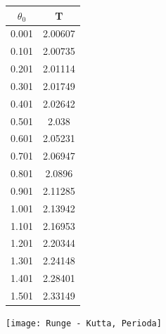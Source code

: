 \documentclass[reqno, a4paper]{amsart}
\begin{document}
\begin{minipage}{\textwidth}
\begin{minipage}[b]{0.2\textwidth}
\centering
\begin{tabular}{|c|c|}
\hline
$\theta_{0}$ & T \\ 
\hline
0.001& 2.00607\\0.101& 2.00735\\0.201& 2.01114\\0.301& 2.01749\\0.401& 2.02642\\0.501& 2.038\\0.601& 2.05231\\0.701& 2.06947\\0.801& 2.0896\\0.901& 2.11285\\1.001& 2.13942
\\1.101& 2.16953\\1.201& 2.20344\\1.301& 2.24148\\1.401& 2.28401\\1.501& 2.33149\\
\hline
\end{tabular}
\end{minipage}
\begin{minipage}[b]{0.79\textwidth}
\centering
\texttt{[image: Runge - Kutta, Perioda]}
\end{minipage}
\hfill
\end{minipage}

\clearpage
\end{document}
